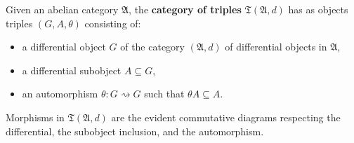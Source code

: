 Given an abelian category $\mathfrak{A}$, the \textbf{category of triples} $\mathfrak{T}(\mathfrak{A}, d)$ has as objects triples $(G, A, \theta)$ consisting of:
\begin{itemize}
\item a differential object $G$ of the category $(\mathfrak{A}, d)$ of differential objects in $\mathfrak{A}$,
\item a differential subobject $A \subseteq G$,
\item an automorphism $\theta : G \rightsquigarrow G$ such that $\theta A \subseteq A$.
\end{itemize}

Morphisms in $\mathfrak{T}(\mathfrak{A}, d)$ are the evident commutative diagrams respecting the differential, the subobject inclusion, and the automorphism.
